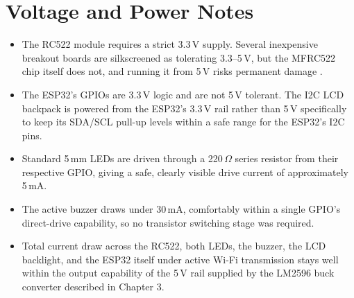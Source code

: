 \section*{Voltage and Power Notes}

\begin{itemize}
    \item The RC522 module requires a strict 3.3\,V supply. Several inexpensive breakout boards are silkscreened as tolerating 3.3--5\,V, but the MFRC522 chip itself does not, and running it from 5\,V risks permanent damage \parencite{nxp2016mfrc522}.
    \item The ESP32's GPIOs are 3.3\,V logic and are not 5\,V tolerant. The I2C LCD backpack is powered from the ESP32's 3.3\,V rail rather than 5\,V specifically to keep its SDA/SCL pull-up levels within a safe range for the ESP32's I2C pins.
    \item Standard 5\,mm LEDs are driven through a 220\,$\Omega$ series resistor from their respective GPIO, giving a safe, clearly visible drive current of approximately 5\,mA.
    \item The active buzzer draws under 30\,mA, comfortably within a single GPIO's direct-drive capability, so no transistor switching stage was required.
    \item Total current draw across the RC522, both LEDs, the buzzer, the LCD backlight, and the ESP32 itself under active Wi-Fi transmission stays well within the output capability of the 5\,V rail supplied by the LM2596 buck converter described in Chapter 3.
\end{itemize}
